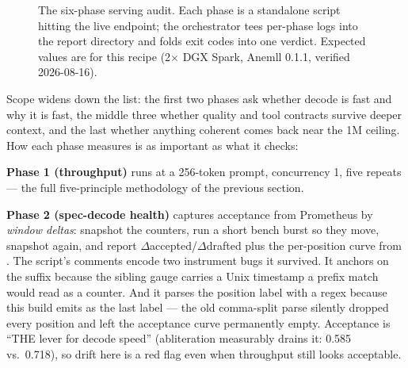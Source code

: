 \begin{figure}[htbp]
\caption{The six-phase serving audit. Each phase is a standalone script
hitting the live endpoint; the orchestrator tees per-phase logs into the
report directory and folds exit codes into one verdict. Expected values are
for this recipe (2$\times$ DGX Spark, Anemll 0.1.1, verified 2026-08-16).}
\label{fig:audit-pipeline}
\end{figure}

Scope widens down the list: the first two phases ask whether decode is fast
and why it is fast, the middle three whether quality and tool contracts
survive deeper context, and the last whether anything coherent comes back
near the 1M ceiling. How each phase measures is as important as what it
checks:

\textbf{Phase 1 (throughput)} runs  at a
256-token prompt, concurrency 1, five repeats --- the full five-principle
methodology of the previous section.

\textbf{Phase 2 (spec-decode health)} captures acceptance from Prometheus
 by \emph{window deltas}: snapshot the counters, run a short
bench burst so they move, snapshot again, and report
$\Delta$accepted/$\Delta$drafted plus the per-position curve from
. The script's
comments encode two instrument bugs it survived. It anchors on the
 suffix because the sibling  gauge carries a
Unix timestamp a prefix match would read as a counter. And it parses the
position label with a regex because this build emits  as the
last label --- the old comma-split parse silently dropped every position
and left the acceptance curve permanently empty. Acceptance is ``THE lever
for decode speed'' (abliteration measurably drains it: 0.585 vs.\ 0.718),
so drift here is a red flag even when throughput still looks acceptable.

